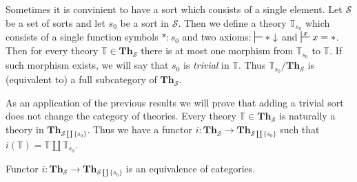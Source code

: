 \documentclass[reqno]{amsart}
\theoremstyle{definition}
\theoremstyle{remark}
\newcommand{\cat}[1]{\mathbf{#1}}
\newcommand{\Th}{\cat{Th}}
\numberwithin{figure}{section}
\begin{document}
Sometimes it is convinient to have a sort which consists of a single element.
Let $\mathcal{S}$ be a set of sorts and let $s_0$ be a sort in $\mathcal{S}$.
Then we define a theory $\mathbb{T}_{s_0}$ which consists of a single function symbols $* : s_0$ and two axioms: $\sststile{}{} * \downarrow$ and $\sststile{}{x} x = *$.
Then for every theory $\mathbb{T} \in \Th_\mathcal{S}$ there is at most one morphism from $\mathbb{T}_{s_0}$ to $\mathbb{T}$.
If such morphism exists, we will say that $s_0$ is \emph{trivial} in $\mathbb{T}$.
Thus $\mathbb{T}_{s_0}/\Th_\mathcal{S}$ is (equivalent to) a full subcategory of $\Th_\mathcal{S}$.

As an application of the previous results we will prove that adding a trivial sort does not change the category of theories.
Every theory $\mathbb{T} \in \Th_\mathcal{S}$ is naturally a theory in $\Th_{\mathcal{S} \amalg \{ s_0 \}}$.
Thus we have a functor $i : \Th_\mathcal{S} \to \Th_{\mathcal{S} \amalg \{ s_0 \}}$ such that $i(\mathbb{T}) = \mathbb{T} \amalg \mathbb{T}_{s_0}$.
\begin{prop}
Functor $i : \Th_\mathcal{S} \to \Th_{\mathcal{S} \amalg \{ s_0 \}}$ is an equivalence of categories.
\end{prop}
\end{document}
